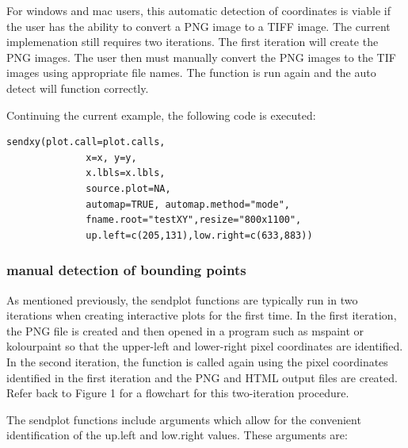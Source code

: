 \documentclass[]{article}
\begin{document}
\indent For windows and mac users, this automatic detection of coordinates is viable if the user has the ability to convert a PNG image to a TIFF image. The current implemenation still requires two iterations. The first iteration will create the PNG images. The user then must manually convert the PNG images to the TIF images using appropriate file names. The function is run again and the auto detect will function correctly.  

\indent Continuing the current example, the following code is executed:
\begin{verbatim}
sendxy(plot.call=plot.calls, 
              x=x, y=y,
              x.lbls=x.lbls, 
              source.plot=NA, 
              automap=TRUE, automap.method="mode",
              fname.root="testXY",resize="800x1100",
              up.left=c(205,131),low.right=c(633,883))
\end{verbatim}


\subsubsection{manual detection of bounding points}

\indent As mentioned previously, the sendplot functions are typically run in two iterations when creating interactive plots for the first time. In the first iteration, the PNG file is created and then opened in a program such as mspaint or kolourpaint so that the upper-left and lower-right pixel coordinates are identified. In the second iteration, the function is called again using the pixel coordinates identified in the first iteration and the PNG and HTML output files are created.  Refer back to Figure 1 for a flowchart for this two-iteration procedure. 


\indent The sendplot functions  include arguments which allow for the convenient identification of the up.left and low.right values. These arguments are:
\end{document}
